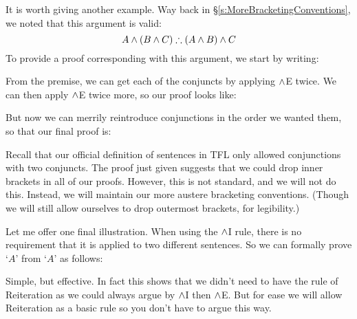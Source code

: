 It is worth giving another example. Way back in \S\ref{s:MoreBracketingConventions}, we noted that this argument is valid:
	$$A \eand (B \eand C) \therefore (A \eand B) \eand C$$
To provide a proof corresponding with this argument, we start by writing:
\begin{fitchproof}
\end{fitchproof}
From the premise, we can get each of the conjuncts by applying $\mathbin{\wedge}$E twice. We can then apply $\mathbin{\wedge}$E twice more, so our proof looks like:
\begin{fitchproof}
	 
	 
	 
	 
\end{fitchproof}
But now we can merrily reintroduce conjunctions in the order we wanted them, so that our final proof is:
\begin{fitchproof}
	 
	 
	 
	 
\end{fitchproof}
Recall that our official definition of sentences in TFL only allowed conjunctions with two conjuncts. The proof just given suggests that we could drop inner brackets in all of our proofs. However, this is not standard, and we will not do this. Instead, we will maintain our more austere bracketing conventions. (Though we will still allow ourselves to drop outermost brackets, for legibility.)

Let me offer one final illustration. When using the $\mathbin{\wedge}$I rule, there is no requirement that it is applied to two different sentences. So we can formally prove `$A$' from `$A$' as follows:
\begin{fitchproof}
\end{fitchproof}
Simple, but effective. In fact this shows that we didn't need to have the rule of Reiteration as we could always argue by $\mathbin{\wedge}$I then $\mathbin{\wedge}$E. But for ease we will allow Reiteration as a basic rule so you don't have to argue this way.



